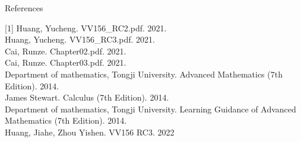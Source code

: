 \begin{frame}{References}

    [1] Huang, Yucheng. VV156\_RC2.pdf. 2021.\\
    \bigskip
    [2] Huang, Yucheng. VV156\_RC3.pdf. 2021.\\
    \bigskip
    [3] Cai, Runze. Chapter02.pdf. 2021.\\
    \bigskip
    [4] Cai, Runze. Chapter03.pdf. 2021.\\
    \bigskip
    [5] Department of mathematics, Tongji University. Advanced Mathematics (7th Edition). 2014.\\
    \bigskip
    [6] James Stewart. Calculus (7th Edition). 2014.\\
    \bigskip
    [7] Department of mathematics, Tongji University. Learning Guidance of Advanced Mathematics (7th Edition). 2014.\\
    \bigskip
    [8]Huang, Jiahe, Zhou Yishen. VV156 RC3. 2022\\
\end{frame}
